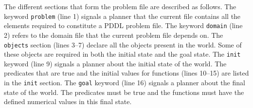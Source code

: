The different sections that form the problem file are described as follows. The keyword 
\texttt{problem} (line 1) signals a planner that the current file contains all the elements 
required to constitute a PDDL problem file. The keyword \texttt{domain} (line 2) refers to 
the domain file that the current problem file depends on. The \texttt{objects} section (lines 3--7) 
declare all the objects present in the world. Some of these objects are required in both the 
initial state and the goal state. The \texttt{init} keyword (line 9) signals a planner about 
the initial state of the world. The predicates that are true and the initial values for 
functions (lines 10--15) are listed in the \texttt{init} section. The \texttt{goal} keyword 
(line 16) signals a planner about the final state of the world. The predicates must be true 
and the functions must have the defined numerical values in this final state.

